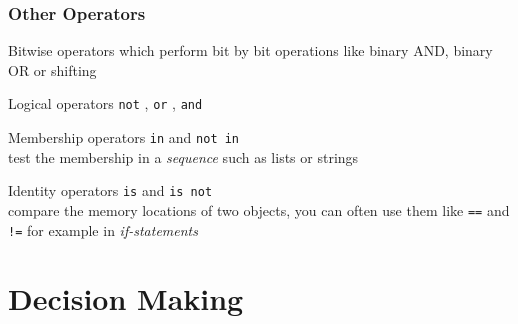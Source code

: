 \documentclass{beamer}
\begin{document}
\begin{frame}
\frametitle{Other Operators}
	\begin{alertblock}{Bitwise operators} 
		which perform bit by bit operations like binary AND, binary OR or shifting
	\end{alertblock}
	\begin{alertblock}{Logical operators} 
		\texttt{not} , \texttt{or} , \texttt{and} \\
	\end{alertblock}
	\begin{alertblock} {Membership operators} 
		\texttt{in} and \texttt{not in} \\test the membership in a \textit{sequence} such as lists or strings
	\end{alertblock}
	\begin{alertblock}{Identity operators} 
		\texttt{is} and \texttt{is not} \\compare the memory locations of two objects, you can often use them like \texttt{==} and \texttt{!=}	for example in \textit{if-statements}
	\end{alertblock}
\end{frame}

\section{Decision Making}
\end{document}

